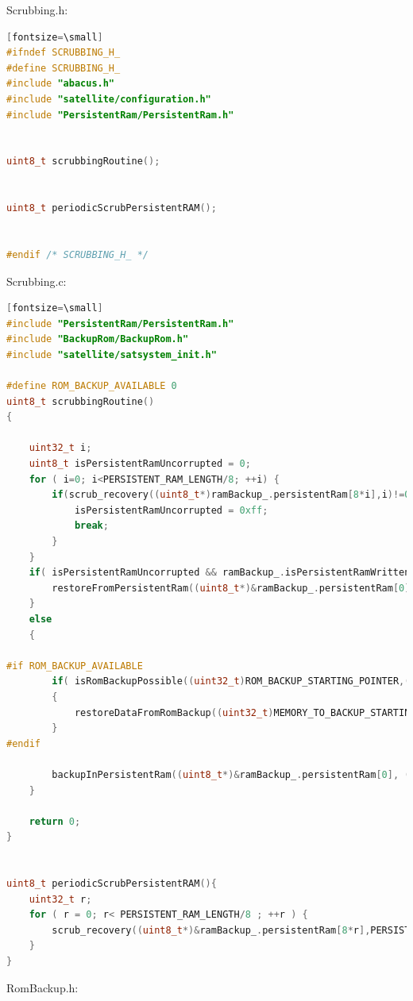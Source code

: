 \documentclass[LaM,binding=0.6cm]{../sapthesis}
\begin{document}
Scrubbing.h:
\begin{lstlisting}[language=c][fontsize=\small]
#ifndef SCRUBBING_H_
#define SCRUBBING_H_
#include "abacus.h"
#include "satellite/configuration.h"
#include "PersistentRam/PersistentRam.h"


uint8_t scrubbingRoutine();


uint8_t periodicScrubPersistentRAM();


#endif /* SCRUBBING_H_ */
\end{lstlisting}
Scrubbing.c:
\begin{lstlisting}[language=c][fontsize=\small]
#include "PersistentRam/PersistentRam.h"
#include "BackupRom/BackupRom.h"
#include "satellite/satsystem_init.h"

#define ROM_BACKUP_AVAILABLE 0
uint8_t scrubbingRoutine()
{

    uint32_t i;
    uint8_t isPersistentRamUncorrupted = 0;
    for ( i=0; i<PERSISTENT_RAM_LENGTH/8; ++i) {
        if(scrub_recovery((uint8_t*)ramBackup_.persistentRam[8*i],i)!=0x0) {
            isPersistentRamUncorrupted = 0xff;
            break;
        }
    }
    if( isPersistentRamUncorrupted && ramBackup_.isPersistentRamWritten ) {
        restoreFromPersistentRam((uint8_t*)&ramBackup_.persistentRam[0],(uint8_t*)&satelliteStatus_,PERSISTENT_RAM_LENGTH);
    }
    else
    {

#if ROM_BACKUP_AVAILABLE
        if( isRomBackupPossible((uint32_t)ROM_BACKUP_STARTING_POINTER,(uint32_t)PERSISTENT_RAM_BYTE_SIZE) )
        {
            restoreDataFromRomBackup((uint32_t)MEMORY_TO_BACKUP_STARTING_POINTER, (uint32_t)ROM_BACKUP_STARTING_POINTER, (uint32_t)PERSISTENT_RAM_BYTE_SIZE);
        }
#endif

        backupInPersistentRam((uint8_t*)&ramBackup_.persistentRam[0], (uint8_t*)&satelliteStatus_, PERSISTENT_RAM_LENGTH);
    }

    return 0;
}


uint8_t periodicScrubPersistentRAM(){
    uint32_t r;
    for ( r = 0; r< PERSISTENT_RAM_LENGTH/8 ; ++r ) {
        scrub_recovery((uint8_t*)&ramBackup_.persistentRam[8*r],PERSISTENT_RAM_LENGTH/8);
    }
}

\end{lstlisting}
RomBackup.h:
\end{document}
